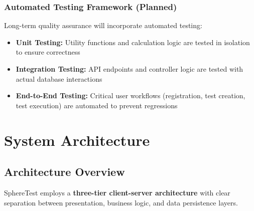 \documentclass[12pt,a4paper]{report}
\begin{document}
\subsection{Automated Testing Framework (Planned)
}

Long-term quality assurance will incorporate automated testing:

\begin{itemize}[left=0pt]
  \item \textbf{Unit Testing:} Utility functions and calculation logic are tested in isolation to ensure correctness
  \item \textbf{Integration Testing:} API endpoints and controller logic are tested with actual database interactions
  \item \textbf{End-to-End Testing:} Critical user workflows (registration, test creation, test execution) are automated to prevent regressions
\end{itemize}

\cleardoublepage


\chapter{System Architecture}

\section{Architecture Overview}

SphereTest employs a \textbf{three-tier client-server architecture} with clear separation between presentation, business logic, and data persistence layers.
\end{document}
